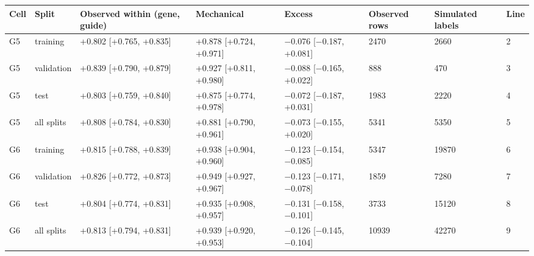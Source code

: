 \begin{tabular}{llllllll}
\toprule
Cell & Split & Observed within (gene, guide) & Mechanical & Excess & Observed rows & Simulated labels & Line \\
\midrule
G5 & training & +0.802 [+0.765, +0.835] & +0.878 [+0.724, +0.971] & −0.076 [−0.187, +0.081] & 2470 & 2660 & 2 \\
G5 & validation & +0.839 [+0.790, +0.879] & +0.927 [+0.811, +0.980] & −0.088 [−0.165, +0.022] & 888 & 470 & 3 \\
G5 & test & +0.803 [+0.759, +0.840] & +0.875 [+0.774, +0.978] & −0.072 [−0.187, +0.031] & 1983 & 2220 & 4 \\
G5 & all splits & +0.808 [+0.784, +0.830] & +0.881 [+0.790, +0.961] & −0.073 [−0.155, +0.020] & 5341 & 5350 & 5 \\
G6 & training & +0.815 [+0.788, +0.839] & +0.938 [+0.904, +0.960] & −0.123 [−0.154, −0.085] & 5347 & 19870 & 6 \\
G6 & validation & +0.826 [+0.772, +0.873] & +0.949 [+0.927, +0.967] & −0.123 [−0.171, −0.078] & 1859 & 7280 & 7 \\
G6 & test & +0.804 [+0.774, +0.831] & +0.935 [+0.908, +0.957] & −0.131 [−0.158, −0.101] & 3733 & 15120 & 8 \\
G6 & all splits & +0.813 [+0.794, +0.831] & +0.939 [+0.920, +0.953] & −0.126 [−0.145, −0.104] & 10939 & 42270 & 9 \\
\bottomrule
\end{tabular}
